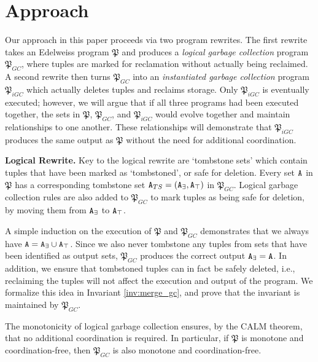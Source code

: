 
\section{Approach}
\label{sec:approach}

Our approach in this paper proceeds via two program rewrites.
The first rewrite takes an Edelweiss program $\mathfrak{P}$ and produces a \emph{logical garbage collection} program $\mathfrak{P}_{GC}$, where tuples are marked for reclamation without actually being reclaimed.
A second rewrite then turns $\mathfrak{P}_{GC}$ into an \emph{instantiated garbage collection} program $\mathfrak{P}_{iGC}$ which actually deletes tuples and reclaims storage.
Only $\mathfrak{P}_{iGC}$ is eventually executed;
however, we will argue that if all three programs had been executed together, the sets in $\mathfrak{P}$, $\mathfrak{P}_{GC}$, and $\mathfrak{P}_{iGC}$ would evolve together and maintain relationships to one another.
These relationships will demonstrate that $\mathfrak{P}_{iGC}$ produces the same output as $\mathfrak{P}$ without the need for additional coordination.

\textbf{Logical Rewrite.}
Key to the logical rewrite are `tombstone sets' which contain tuples that have been marked as `tombstoned', or safe for deletion.
Every set $\tt{A}$ in $\mathfrak{P}$ has a corresponding tombstone set $\tt{A}_{TS} = (\tt{A}_\exists, \tt{A}_\top)$ in $\mathfrak{P}_{GC}$.
Logical garbage collection rules are also added to $\mathfrak{P}_{GC}$ to mark tuples as being safe for deletion, by moving them from $\tt{A}_\exists$ to $\tt{A}_\top$.

A simple induction on the execution of $\mathfrak{P}$ and $\mathfrak{P}_{GC}$ demonstrates that we always have $\tt{A} = \tt{A}_\exists \cup \tt{A}_\top$.
Since we also never tombstone any tuples from sets that have been identified as output sets, $\mathfrak{P}_{GC}$ produces the correct output $\tt{A}_\exists = \tt{A}$.
In addition, we ensure that tombstoned tuples can in fact be safely deleted, i.e., reclaiming the tuples will not affect the execution and output of the program.
We formalize this idea in Invariant \ref{inv:merge_gc}, and prove that the invariant is maintained by $\mathfrak{P}_{GC}$.

The monotonicity of logical garbage collection ensures, by the CALM theorem, that no additional coordination is required.
In particular, if $\mathfrak{P}$ is monotone and coordination-free, then $\mathfrak{P}_{GC}$ is also monotone and coordination-free.


